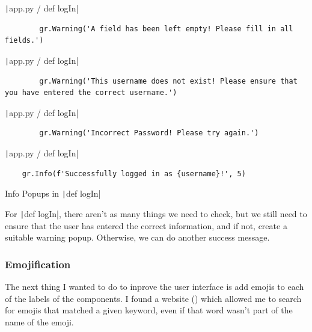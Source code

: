 \documentclass[12pt]{report}
\newcommand{\pil}[1]{\protect\texttt|#1|}
\begin{document}
\begin{listing}[H]
\pil{app.py / def logIn}
\begin{verbatim}
        gr.Warning('A field has been left empty! Please fill in all fields.')
\end{verbatim}
\pil{app.py / def logIn}
\begin{verbatim}
        gr.Warning('This username does not exist! Please ensure that you have entered the correct username.')
\end{verbatim}
\pil{app.py / def logIn}
\begin{verbatim}
        gr.Warning('Incorrect Password! Please try again.')
\end{verbatim}
\pil{app.py / def logIn}
\begin{verbatim}
    gr.Info(f'Successfully logged in as {username}!', 5)
\end{verbatim}
\caption{Info Popups in \pil{def logIn}}\label{cs:infoPopups7}
\end{listing}

For \pil{def logIn}, there aren't as many things we need to check, but we still need to ensure that the user has entered the correct information, and if not, create a suitable warning popup. Otherwise, we can do another success message.

\begin{center}
\end{center}

\subsubsection{Emojification}
The next thing I wanted to do to inprove the user interface is add emojis to each of the labels of the components. I found a website (\cite{emojisSearch}) which allowed me to search for emojis that matched a given keyword, even if that word wasn't part of the name of the emoji.
\end{document}
